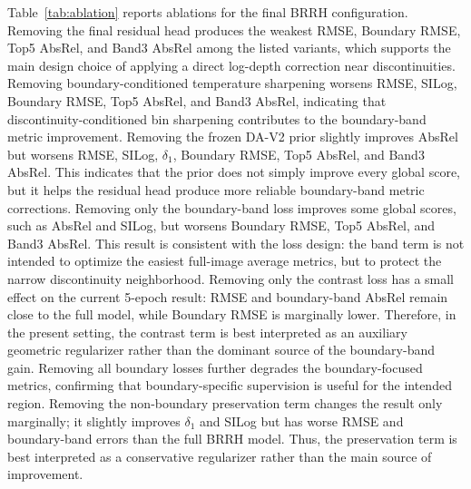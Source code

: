 \documentclass{ieeeaccess}
\begin{document}
Table~\ref{tab:ablation} reports ablations for the final BRRH configuration. Removing the final residual head produces the weakest RMSE, Boundary RMSE, Top5 AbsRel, and Band3 AbsRel among the listed variants, which supports the main design choice of applying a direct log-depth correction near discontinuities. Removing boundary-conditioned temperature sharpening worsens RMSE, SILog, Boundary RMSE, Top5 AbsRel, and Band3 AbsRel, indicating that discontinuity-conditioned bin sharpening contributes to the boundary-band metric improvement. Removing the frozen DA-V2 prior slightly improves AbsRel but worsens RMSE, SILog, $\delta_1$, Boundary RMSE, Top5 AbsRel, and Band3 AbsRel. This indicates that the prior does not simply improve every global score, but it helps the residual head produce more reliable boundary-band metric corrections. Removing only the boundary-band loss improves some global scores, such as AbsRel and SILog, but worsens Boundary RMSE, Top5 AbsRel, and Band3 AbsRel. This result is consistent with the loss design: the band term is not intended to optimize the easiest full-image average metrics, but to protect the narrow discontinuity neighborhood. Removing only the contrast loss has a small effect on the current 5-epoch result: RMSE and boundary-band AbsRel remain close to the full model, while Boundary RMSE is marginally lower. Therefore, in the present setting, the contrast term is best interpreted as an auxiliary geometric regularizer rather than the dominant source of the boundary-band gain. Removing all boundary losses further degrades the boundary-focused metrics, confirming that boundary-specific supervision is useful for the intended region. Removing the non-boundary preservation term changes the result only marginally; it slightly improves $\delta_1$ and SILog but has worse RMSE and boundary-band errors than the full BRRH model. Thus, the preservation term is best interpreted as a conservative regularizer rather than the main source of improvement.
\end{document}
